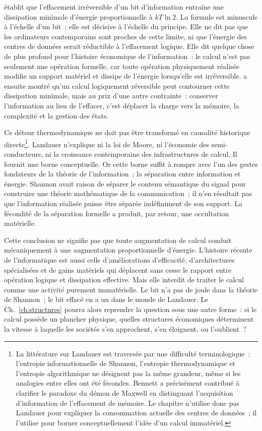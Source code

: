 \textcite{landauer_irreversibility_1961} établit que l'effacement irréversible d'un bit d'information entraîne une dissipation minimale d'énergie proportionnelle à $kT\ln 2$. La formule est minuscule à l'échelle d'un bit~; elle est décisive à l'échelle du principe. Elle ne dit pas que les ordinateurs contemporains sont proches de cette limite, ni que l'énergie des centres de données serait réductible à l'effacement logique. Elle dit quelque chose de plus profond pour l'histoire économique de l'information~: le calcul n'est pas seulement une opération formelle, car toute opération physiquement réalisée modifie un support matériel et dissipe de l'énergie lorsqu'elle est irréversible. \textcite{bennett_logical_1973,bennett_thermodynamics_1982} a ensuite montré qu'un calcul logiquement réversible peut contourner cette dissipation minimale, mais au prix d'une autre contrainte~: conserver l'information au lieu de l'effacer, c'est déplacer la charge vers la mémoire, la complexité et la gestion des états.

%
Ce détour thermodynamique ne doit pas être transformé en causalité historique directe\footnote{La littérature sur Landauer est traversée par une difficulté terminologique~: l'entropie informationnelle de Shannon, l'entropie thermodynamique et l'entropie algorithmique ne désignent pas la même grandeur, même si les analogies entre elles ont été fécondes. Bennett a précisément contribué à clarifier le paradoxe du démon de Maxwell en distinguant l'acquisition d'information de l'effacement de mémoire. Le chapitre n'utilise donc pas Landauer pour expliquer la consommation actuelle des centres de données~; il l'utilise pour borner conceptuellement l'idée d'un calcul immatériel.}. Landauer n'explique ni la loi de Moore, ni l'économie des semi-conducteurs, ni la croissance contemporaine des infrastructures de calcul. Il fournit une borne conceptuelle. Or cette borne suffit à rompre avec l'un des gestes fondateurs de la théorie de l'information~: la séparation entre information et énergie. Shannon avait raison de séparer le contenu sémantique du signal pour construire une théorie mathématique de la communication~; il n'en résultait pas que l'information réalisée puisse être séparée indéfiniment de son support. La fécondité de la séparation formelle a produit, par retour, une occultation matérielle.

Cette conclusion ne signifie pas que toute augmentation de calcul conduit mécaniquement à une augmentation proportionnelle d'énergie. L'histoire récente de l'informatique est aussi celle d'améliorations d'efficacité, d'architectures spécialisées et de gains matériels qui déplacent sans cesse le rapport entre opération logique et dissipation effective. Mais elle interdit de traiter le calcul comme une activité purement immatérielle. Le bit n'a pas de joule dans la théorie de Shannon~; le bit effacé en a un dans le monde de Landauer. Le Ch.~\ref{ch:structures} pourra alors reprendre la question sous une autre forme~: si le calcul possède un plancher physique, quelles structures économiques déterminent la vitesse à laquelle les sociétés s'en approchent, s'en éloignent, ou l'oublient~?


